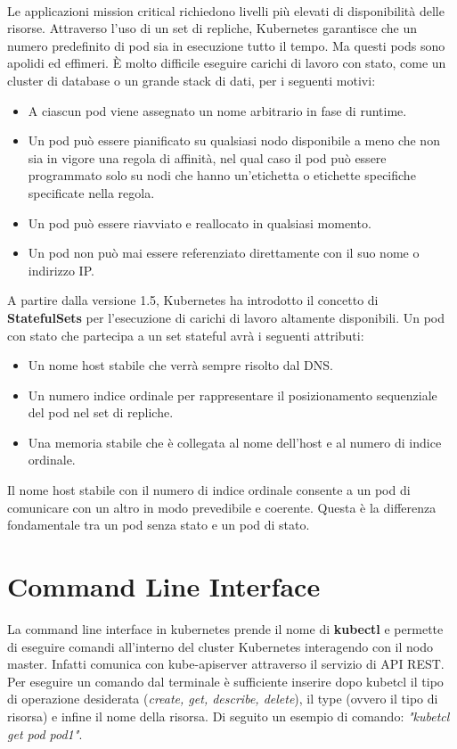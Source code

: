 \documentclass[12pt, a4paper]{report}
\begin{document}
\\
Le applicazioni mission critical richiedono livelli più elevati di disponibilità delle risorse. Attraverso l'uso di un set di repliche, Kubernetes garantisce che un numero predefinito di pod sia in esecuzione tutto il tempo. Ma questi pods sono apolidi ed effimeri. È molto difficile eseguire carichi di lavoro con stato, come un cluster di database o un grande stack di dati, per i seguenti motivi:
\begin{itemize}
  \item A ciascun pod viene assegnato un nome arbitrario in fase di runtime.
  \item Un pod può essere pianificato su qualsiasi nodo disponibile a meno che non sia in vigore una regola di affinità, nel qual caso il pod può essere programmato solo su nodi che hanno un'etichetta o etichette specifiche specificate nella regola.
  \item Un pod può essere riavviato e reallocato in qualsiasi momento.
  \item Un pod non può mai essere referenziato direttamente con il suo nome o indirizzo IP.
\end{itemize}
A partire dalla versione 1.5, Kubernetes ha introdotto il concetto di \textbf{StatefulSets} per l'esecuzione di carichi di lavoro altamente disponibili. Un pod con stato che partecipa a un set stateful avrà i seguenti attributi:
\begin{itemize}
  \item Un nome host stabile che verrà sempre risolto dal DNS.
  \item Un numero indice ordinale per rappresentare il posizionamento sequenziale del pod nel set di repliche.
  \item Una memoria stabile che è collegata al nome dell'host e al numero di indice ordinale.
\end{itemize}
Il nome host stabile con il numero di indice ordinale consente a un pod di comunicare con un altro in modo prevedibile e coerente. Questa è la differenza fondamentale tra un pod senza stato e un pod di stato.
\section{Command Line Interface}
La command line interface in kubernetes prende il nome di \textbf{kubectl} e permette di eseguire comandi all'interno del cluster Kubernetes interagendo con il nodo master. Infatti comunica con kube-apiserver attraverso il servizio di API REST. Per eseguire un comando dal terminale è sufficiente inserire dopo kubetcl il tipo di operazione desiderata (\textit{create, get, describe, delete}), il type (ovvero il tipo di risorsa) e infine il nome della risorsa. Di seguito un esempio di comando: \textit{"kubetcl get pod pod1"}.
\end{document}
